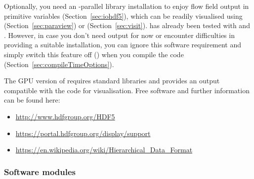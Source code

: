 \documentclass[a4paper, 11pt, DIV=11]{scrartcl}
\begin{document}
Optionally, you need an \mpi-parallel \hdf library installation to
enjoy flow field output in primitive variables (Section~\ref{sec:iohdf5}),
which can be readily visualised using \eg \paraview (Section~\ref{sec:paraview})
or \visit (Section~\ref{sec:visit}). \nsc has already been tested with
 and . However, in case you don't need
\hdf output for now or encounter difficulties in providing a suitable \hdf
installation, you can ignore this software requirement and simply switch this
feature off () when you compile the code
(Section~\ref{sec:compileTimeOptions}). \par
The GPU version of \nsc requires standard \hdf libraries and provides an output
compatible with the \fortran code for visualisation.
Free software and further information can
be found here:
\begin{itemize}
\item \url{http://www.hdfgroup.org/HDF5}
\item \url{https://portal.hdfgroup.org/display/support}
\item \url{https://en.wikipedia.org/wiki/Hierarchical_Data_Format}
\end{itemize}

\subsubsection{Software modules}
\label{sec:softwareModules}
\end{document}
